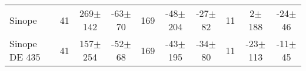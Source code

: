 \documentclass[11pt,a4paper]{report}
\begin{document}
\begin{landscape}
\begin{table*}
\begin{centering}
\begin{tabular}{l|ccc|ccc|ccc}
\hdashline
Sinope  & 41 & 269$\pm$142 & -63$\pm$ 70 & 169 & -48$\pm$204 & -27$\pm$ 82 & 11 &   2$\pm$188 & -24$\pm$ 46\tabularnewline
Sinope DE 435 & 41 & 157$\pm$254 & -52$\pm$ 68 & 169 & -43$\pm$195 & -34$\pm$ 80 & 11 & -23$\pm$113 & -11$\pm$ 45 \tabularnewline
\hline
\end{tabular}
\par \end{centering}
\end{table*}

\end{landscape}
\end{document}
